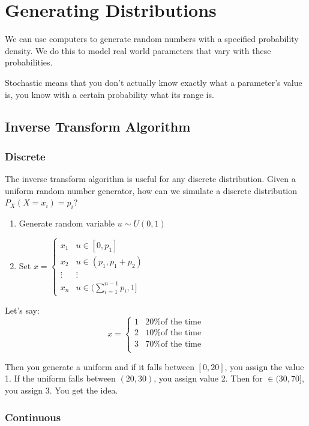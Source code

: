 \documentclass{report}
\begin{document}
\section{Generating Distributions}

We can use computers to generate random numbers with a specified probability density. We do this to model real world parameters that vary with these probabilities.

Stochastic means that you don't actually know exactly what a parameter's value is, you know with a certain probability what its range is.

\subsection{Inverse Transform Algorithm}

\subsubsection{Discrete}

The inverse transform algorithm is useful for any discrete distribution. 
 Given a uniform random number generator, how can we simulate a discrete distribution $P_X(X=x_i)=p_i$?

\begin{enumerate}
\item Generate random variable $u \sim U(0,1)$
\item Set $x = \begin{cases}
x_1 & u \in [0,p_1] \\
x_2 & u \in (p_1, p_1 + p_2) \\
\vdots & \vdots \\
x_n & u \in (\sum_{i=1}^{n-1} p_i, 1]
\end{cases}$
\end{enumerate}

Let's say: $$x = \begin{cases}
1 & \text{20\% of the time} \\
2 & \text{10\% of the time} \\
3 & \text{70\% of the time} \\
\end{cases}$$

Then you generate a uniform and if it falls between $[0,20]$, you assign the value 1. If the uniform falls between $(20,30)$, you assign value 2. Then for $ \in (30, 70]$, you assign 3. You get the idea.

\subsubsection{Continuous}
\end{document}
